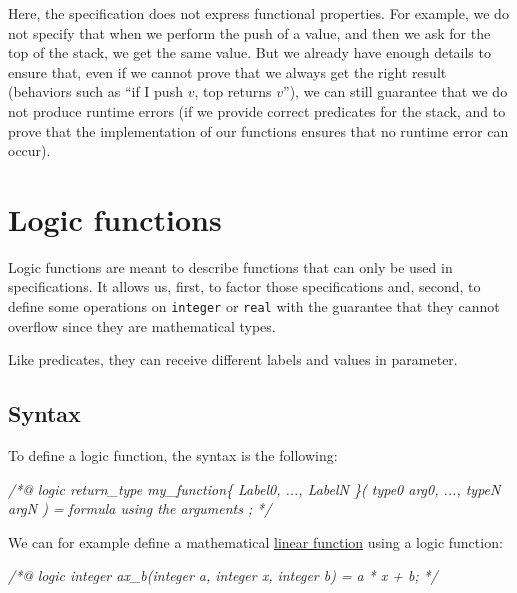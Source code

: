 \documentclass[12pt,francais,]{scrbook}
\newenvironment{Shaded}{}{}
\newcommand{\CommentTok}[1]{\textcolor[rgb]{0.38,0.63,0.69}{\textit{{#1}}}}
\begin{document}
Here, the specification does not express functional properties. For
example, we do not specify that when we perform the push of a value, and
then we ask for the top of the stack, we get the same value. But we
already have enough details to ensure that, even if we cannot prove that
we always get the right result (behaviors such as ``if I push \(v\), top
returns \(v\)''), we can still guarantee that we do not produce runtime
errors (if we provide correct predicates for the stack, and to prove
that the implementation of our functions ensures that no runtime error
can occur).

\section{Logic functions}\label{logic-functions}

Logic functions are meant to describe functions that can only be used in
specifications. It allows us, first, to factor those specifications and,
second, to define some operations on \texttt{integer} or \texttt{real}
with the guarantee that they cannot overflow since they are mathematical
types.

Like predicates, they can receive different labels and values in
parameter.

\subsection{Syntax}\label{syntax-1}

To define a logic function, the syntax is the following:

\begin{footnotesize}\begin{Shaded}
\begin{Highlighting}[]
\CommentTok{/*@}
\CommentTok{  logic return_type my_function\{ Label0, ..., LabelN \}( type0 arg0, ..., typeN argN ) =}
\CommentTok{    formula using the arguments ;}
\CommentTok{*/}
\end{Highlighting}
\end{Shaded}\end{footnotesize}

We can for example define a mathematical
\href{https://en.wikipedia.org/wiki/Linear_function_(calculus)}{linear
function} using a logic function:

\begin{footnotesize}\begin{Shaded}
\begin{Highlighting}[]
\CommentTok{/*@}
\CommentTok{  logic integer ax_b(integer a, integer x, integer b) =}
\CommentTok{    a * x + b;}
\CommentTok{*/}
\end{Highlighting}
\end{Shaded}\end{footnotesize}
\end{document}
